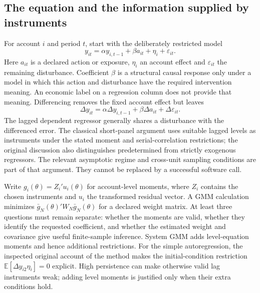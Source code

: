\subsection{The equation and the information supplied by instruments}
For account $i$ and period $t$, start with the deliberately restricted model
\begin{equation}
 y_{it}=\alpha y_{i,t-1}+\beta a_{it}+\eta_i+\varepsilon_{it}.
\end{equation}
Here $a_{it}$ is a declared action or exposure, $\eta_i$ an account effect and
$\varepsilon_{it}$ the remaining disturbance. Coefficient $\beta$ is a structural
causal response only under a model in which this action and disturbance have the
required intervention meaning. An economic label on a regression column does not
provide that meaning. Differencing removes the fixed account effect but leaves
\begin{equation}
 \Delta y_{it}=\alpha\Delta y_{i,t-1}+\beta\Delta a_{it}+\Delta\varepsilon_{it}.
\end{equation}
The lagged dependent regressor generally shares a disturbance with the differenced
error. The classical short-panel argument uses suitable lagged levels as instruments
under the stated moment and serial-correlation restrictions; the original discussion
also distinguishes predetermined from strictly exogenous regressors.
The relevant asymptotic regime and cross-unit sampling conditions are part of that
argument. They cannot be replaced by a successful software call.
\citep{arellano1991}

Write $g_i(\theta)=Z_i'u_i(\theta)$ for account-level moments, where $Z_i$ contains
the chosen instruments and $u_i$ the transformed residual vector. A GMM calculation
minimizes $\bar g_N(\theta)'W_N\bar g_N(\theta)$ for a declared weight matrix.
At least three questions must remain separate: whether the moments are valid, whether
they identify the requested coefficient, and whether the estimated weight and covariance
give useful finite-sample inference. System GMM adds level-equation moments and hence
additional restrictions. For the simple autoregression, the inspected original account
of the method makes the initial-condition restriction
$\mathbb E[\Delta y_{i2}\eta_i]=0$ explicit. High persistence can make otherwise valid
lag instruments weak; adding level moments is justified only when their extra conditions
hold.\citep{blundellbond2023}

